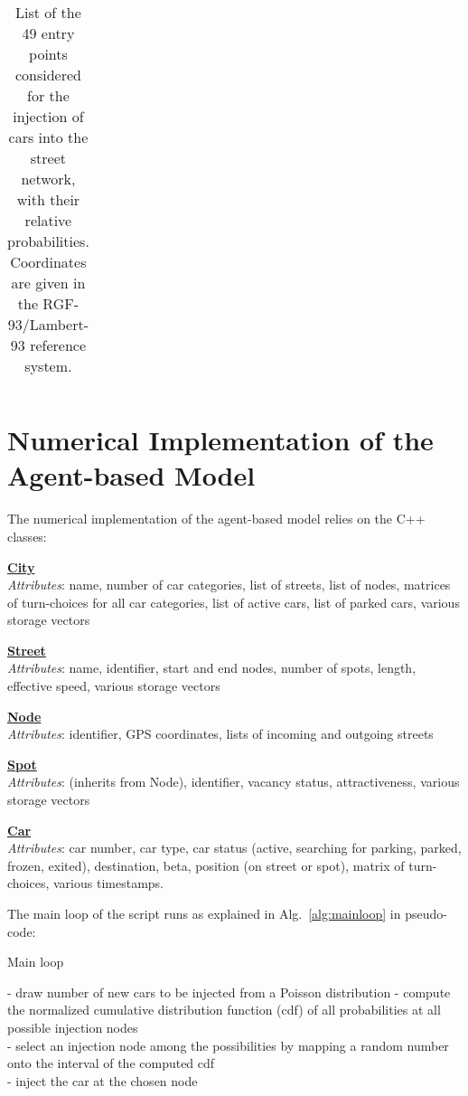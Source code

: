 \documentclass[trsc,reprint]{informs3}
\begin{document}
\begin{APPENDICES}
\begin{table}[H]
\begin{longtable}[c]{|c|c|c|c|}
\end{longtable}

\caption{\label{tab:SI_entries}List of the 49 entry points considered for the injection of cars into the street network, with their relative probabilities. Coordinates are given in the RGF-93/Lambert-93 reference system.}
\end{table}


\clearpage

 \SingleSpacedXII
 
\section{Numerical Implementation of the Agent-based Model \label{sec:app_implementation}}
 
 
 The numerical implementation of the agent-based model relies on the C++ classes: 
 
  \textbf{\underline{City}} \\
  \emph{Attributes}: name, number of car categories, list of streets, list of nodes, matrices of turn-choices for all car categories, list of active cars, list of parked cars, various storage vectors
 
  
   \textbf{\underline{Street}} \\
    \emph{Attributes}: name, identifier, start and end nodes, number of spots, length, effective speed, various storage vectors
   
    \textbf{\underline{Node}} \\
     \emph{Attributes}: identifier, GPS coordinates, lists of incoming and outgoing streets
    
     \textbf{\underline{Spot}} \\
      \emph{Attributes}: (inherits from Node), identifier, vacancy status, attractiveness, various storage vectors

 
 \textbf{\underline{Car}} \\
 \emph{Attributes}: car number, car type, car status (active, searching for parking, parked, frozen, exited), destination, beta, position (on street or spot), matrix of turn-choices, various timestamps.
 
 The main loop of the script runs as explained  in Alg.~\ref{alg:mainloop} in pseudo-code:

 
 
 \begin{algorithm}[h]

\caption{Main loop}
 \label{alg:mainloop}
\begin{algorithmic}
\STATE
    - draw number of new cars to be injected from a Poisson distribution
    \STATE
       - compute the normalized cumulative distribution function (cdf) of all probabilities at all possible injection nodes \\
        -  select an injection node among the possibilities by mapping a random number onto the interval of the computed cdf \\
        - inject the car at the chosen node
    \ENDFOR
    

\end{algorithmic}
\end{algorithm}
\end{APPENDICES}
\end{document}
